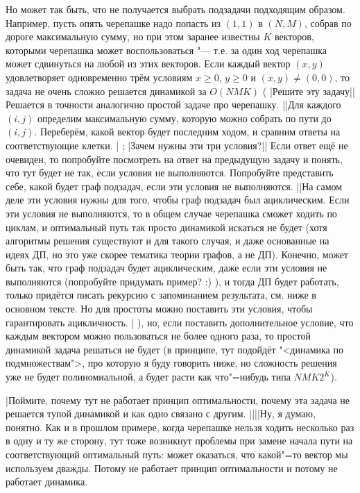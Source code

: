 Но может так быть, что не получается выбрать подзадачи подходящим образом. Например, пусть опять черепашке надо попасть
из $(1,1)$ в $(N,M)$, собрав по дороге максимальную сумму, но при этом заранее известны $K$ векторов, которыми
черепашка может воспользоваться "--- т.е. за один ход черепашка может сдвинуться на любой из этих векторов.
Если каждый вектор $(x,y)$ удовлетворяет одновременно трём условиям $x\geq 0$, $y\geq 0$ и $(x,y)\neq (0,0)$,
то задача не очень сложно решается динамикой за $O(NMK)$ (%
\task|Решите эту задачу||
Решается в точности аналогично простой задаче про черепашку.
||Для каждого $(i,j)$ определим максимальную сумму, которую можно собрать по пути до $(i,j)$. Переберём, какой вектор будет последним ходом, и сравним ответы на соответствующие клетки.
|%
; 
\task|Зачем нужны эти три условия?||
Если ответ ещё не очевиден, то попробуйте посмотреть на ответ на предыдущую задачу и понять, что тут будет не так, если условия не выполняются. Попробуйте представить себе, какой будет граф подзадач, если эти условия не выполняются.
||На самом деле эти условия нужны для того, чтобы граф подзадач был ациклическим. Если эти условия не выполняются, то в общем случае черепашка сможет ходить по циклам, и оптимальный путь так просто динамикой искаться не будет (хотя алгоритмы решения существуют и для такого случая, и даже основанные на идеях ДП, но это уже скорее тематика теории графов, а не ДП). Конечно, может быть так, что граф подзадач будет ациклическим, даже если эти условия не выполняются (попробуйте придумать пример? :) ), и тогда ДП будет работать, только придётся писать рекурсию с запоминанием результата, см. ниже в основном тексте. Но для простоты можно поставить эти условия, чтобы гарантировать ацикличность.
|%
), 
но, если поставить дополнительное условие, что
каждым вектором можно пользоваться не более одного раза, то простой динамикой задача решаться не будет 
(в принципе, тут подойдёт "<динамика по подмножествам">, про которую я буду говорить ниже, но сложность
решения уже не будет полиномиальной, а будет расти как что"=нибудь типа $NMK2^K$).

\task|Поймите, почему тут не работает принцип оптимальности, почему эта задача не решается тупой динамикой и как одно связано с другим.
||||Ну, я думаю, понятно. Как и в прошлом примере, когда черепашке нельзя ходить несколько раз в одну и ту же сторону, тут тоже возникнут проблемы при замене начала пути на соответствующий оптимальный путь: может оказаться, что какой"=то вектор мы используем дважды. Потому не работает принцип оптимальности и потому не работает динамика.

